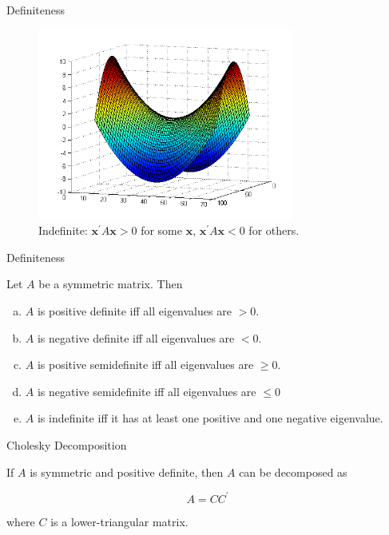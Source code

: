 \documentclass[11pt, xcolor={dvipsnames}, hyperref={colorlinks, allcolors=Blue}]{beamer}
\begin{document}
\begin{frame}{Definiteness}
\begin{figure}
	\centering
	\includegraphics[width=0.75\textwidth]{quadraticform3.png}
	\caption{Indefinite: $\mathbf{x}^{\prime}A\mathbf{x} > 0$ for some $\mathbf{x}$, $\mathbf{x}^{\prime}A\mathbf{x} < 0$ for others.}
\end{figure}
\end{frame}

\begin{frame}{Definiteness}
\begin{theorem}
Let $A$ be a symmetric matrix. Then
\begin{enumerate}[a)]
\item $A$ is positive definite iff all eigenvalues are $> 0$.
\item $A$ is negative definite iff all eigenvalues are $< 0$.
\item $A$ is positive semidefinite iff all eigenvalues are $\geq 0$.
\item $A$ is negative semidefinite iff all eigenvalues are $\leq 0$
\item $A$ is indefinite iff it has at least one positive and one negative eigenvalue.  

\end{enumerate}
\end{theorem}

\end{frame}

\begin{frame}{Cholesky Decomposition}
\begin{theorem}
If $A$ is symmetric and positive definite, then $A$ can be decomposed as

\[A = C C^{\prime}\]

where $C$ is a lower-triangular matrix.
\end{theorem}
\end{frame}
\end{document}
